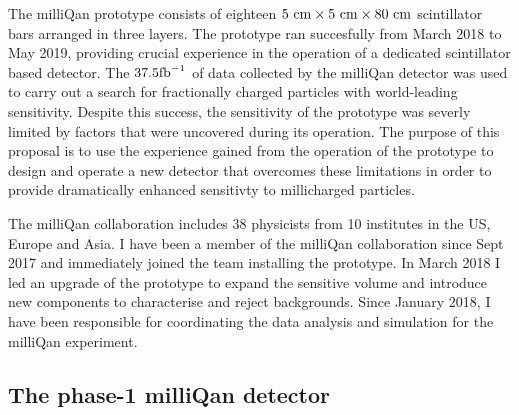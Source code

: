 \documentclass[11pt]{article}
\theoremstyle{plain} \numberwithin{equation}{section}
\theoremstyle{definition}
\begin{document}
The milliQan prototype consists of eighteen $5~\rm{cm}\times5~\rm{cm}\times80~\rm{cm}$ 
scintillator bars arranged in three layers. The prototype ran succesfully from March 2018 to May 2019, providing crucial
experience in the operation of a dedicated scintillator based detector. 
The $37.5\rm{fb}^{-1}$ of data collected by the milliQan detector was used to carry out
a search for fractionally charged particles with world-leading sensitivity.
Despite this success, the sensitivity of the prototype was severly limited by
factors that were uncovered during its operation. The purpose of this proposal is to use
the experience gained from the operation of the prototype to design and operate a new detector
that overcomes these limitations in order to provide dramatically enhanced 
sensitivty to millicharged particles.

The milliQan collaboration includes 38 physicists from 10 institutes in the US, 
Europe and Asia. I have been a member of the milliQan collaboration since Sept 2017 and immediately joined the
team installing the prototype. In March 2018 I led an upgrade of the
prototype to expand the sensitive volume and introduce new components to characterise and reject backgrounds. 
Since January 2018, I have been responsible for coordinating the data analysis and simulation
for the milliQan experiment.

\subsection*{The phase-1 milliQan detector}
\end{document}
